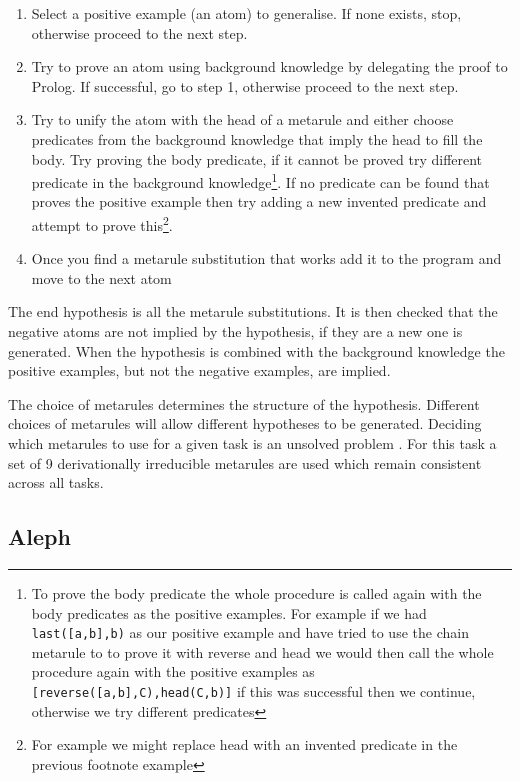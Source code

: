 \begin{enumerate}
\item Select a positive example (an atom) to generalise. If none exists, stop, otherwise proceed to the next step.
\item Try to prove an atom using background knowledge by delegating the proof to Prolog. If successful, go to step 1, otherwise proceed to the next step.
\item Try to unify the atom with the head of a metarule and either choose predicates from the background knowledge that imply the head to fill the body. Try proving the body predicate, if it cannot be proved try different predicate in the background knowledge\footnote{To prove the body predicate the whole procedure is called again with the body predicates as the positive examples. For example if we had \texttt{last([a,b],b)} as our positive example and have tried to use the chain metarule to to prove it with reverse and head we would then call the whole procedure again with the positive examples as \texttt{[reverse([a,b],C),head(C,b)]} if this was successful then we continue, otherwise we try different predicates}. If no predicate can be found that proves the positive example then try adding a new invented predicate and attempt to prove this\footnote{For example we might replace head with an invented predicate in the previous footnote example}.
\item Once you find a metarule substitution that works add it to the program and move to the next atom
\end{enumerate}


The end hypothesis is all the metarule substitutions. It is then checked that the negative atoms are not implied by the hypothesis, if they are a new one is generated. When the hypothesis is combined with the background knowledge the positive examples, but not the negative examples, are implied.

The choice of metarules determines the structure of the hypothesis. Different choices of metarules will allow different hypotheses to be generated. Deciding which metarules to use for a given task is an unsolved problem  \cite{Cropper/Thesis}. For this task a set of 9 derivationally irreducible metarules are used which remain consistent across all tasks.

\subsection{Aleph}\label{sec:aleph}

